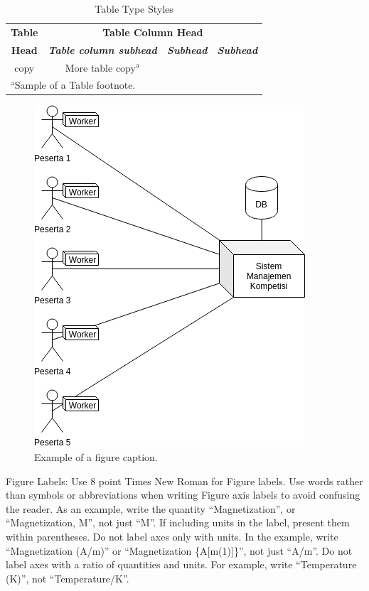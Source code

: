 \documentclass[conference]{IEEEtran}
\begin{document}
\begin{table}[htbp]
\caption{Table Type Styles}
\begin{center}
\begin{tabular}{|c|c|c|c|}
\hline
\textbf{Table}&\multicolumn{3}{|c|}{\textbf{Table Column Head}} \\
\cline{2-4} 
\textbf{Head} & \textbf{\textit{Table column subhead}}& \textbf{\textit{Subhead}}& \textbf{\textit{Subhead}} \\
\hline
copy& More table copy$^{\mathrm{a}}$& &  \\
\hline
\multicolumn{4}{l}{$^{\mathrm{a}}$Sample of a Table footnote.}
\end{tabular}
\label{tab1}
\end{center}
\end{table}

\begin{figure}[htbp]
\centerline{\includegraphics{images/architecture-new.png}}
\caption{Example of a figure caption.}
\label{fig}
\end{figure}

Figure Labels: Use 8 point Times New Roman for Figure labels. Use words 
rather than symbols or abbreviations when writing Figure axis labels to 
avoid confusing the reader. As an example, write the quantity 
``Magnetization'', or ``Magnetization, M'', not just ``M''. If including 
units in the label, present them within parentheses. Do not label axes only 
with units. In the example, write ``Magnetization (A/m)'' or ``Magnetization 
\{A[m(1)]\}'', not just ``A/m''. Do not label axes with a ratio of 
quantities and units. For example, write ``Temperature (K)'', not 
``Temperature/K''.
\end{document}
